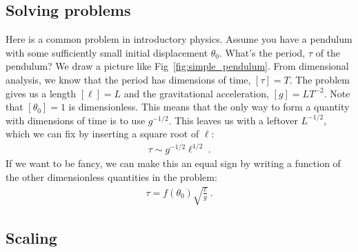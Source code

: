 \documentclass[
  11pt,
	colorful,
	raggedright,
]{tufte-style-thesis-flip}
\begin{document}
\subsection{Solving problems}

Here is a common problem in introductory physics. Assume you have a pendulum with some sufficiently small initial displacement $\theta_0$. What’s the period, $\tau$ of the pendulum? We draw a picture like Fig~\ref{fig:simple_pendulum}.
%
%
%
From dimensional analysis, we know that the period has dimensions of time, $[\tau] = T$. The problem gives us a length $[\ell]=L$ and the gravitational acceleration, $[g]=LT^{-2}$. Note that $[\theta_0] = 1$ is dimensionless. This means that the only way to form a quantity with dimensions of time is to use $g^{-1/2}$. This leaves us with a leftover $L^{-1/2}$, which we can fix by inserting a square root of $\ell$:
\begin{align}
  \tau \sim g^{-1/2} \ell^{1/2} \ .
\end{align}
If we want to be fancy, we can make this an equal sign by writing a function of the other dimensionless quantities in the problem:
\begin{align}
  \tau = f(\theta_0) \sqrt{\frac{\ell}{g}} \ .
\end{align}



\subsection{Scaling}
\end{document}
